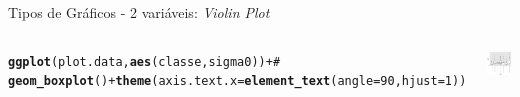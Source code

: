 \documentclass{beamer}\usepackage[]{graphicx}\usepackage[]{color}
\makeatletter
\newcommand{\hlnum}[1]{\textcolor[rgb]{0.686,0.059,0.569}{#1}}%
\newcommand{\hlcom}[1]{\textcolor[rgb]{0.678,0.584,0.686}{\textit{#1}}}%
\newcommand{\hlopt}[1]{\textcolor[rgb]{0,0,0}{#1}}%
\newcommand{\hlstd}[1]{\textcolor[rgb]{0.345,0.345,0.345}{#1}}%
\newcommand{\hlkwc}[1]{\textcolor[rgb]{0.333,0.667,0.333}{#1}}%
\newcommand{\hlkwd}[1]{\textcolor[rgb]{0.737,0.353,0.396}{\textbf{#1}}}%
\newenvironment{kframe}{%
 \def\at@end@of@kframe{}%
 \ifinner\ifhmode%
  \def\at@end@of@kframe{\end{minipage}}%
  \begin{minipage}{\columnwidth}%
 \fi\fi%
 \def\FrameCommand##1{\hskip\@totalleftmargin \hskip-\fboxsep
 \colorbox{shadecolor}{##1}\hskip-\fboxsep
     \hskip-\linewidth \hskip-\@totalleftmargin \hskip\columnwidth}%
 \MakeFramed {\advance\hsize-\width
   \@totalleftmargin\z@ \linewidth\hsize
   \@setminipage}}%
 {\par\unskip\endMakeFramed%
 \at@end@of@kframe}
\newenvironment{knitrout}{}{} %
\renewenvironment{knitrout}{\setlength{\topsep}{0mm}}{}
\makeatother
\begin{document}
\begin{frame}[fragile]{Tipos de Gráficos - 2 variáveis: \emph{Violin Plot}}

\begin{columns}[t]


\begin{knitrout}\tiny
{}\color{fgcolor}\begin{kframe}
\begin{alltt}
\hlkwd{ggplot}\hlstd{(plot.data,}\hlkwd{aes}\hlstd{(classe,sigma0))} \hlopt{+}\hlcom{#}
  \hlkwd{geom_boxplot}\hlstd{()} \hlopt{+} \hlkwd{theme}\hlstd{(}\hlkwc{axis.text.x} \hlstd{=} \hlkwd{element_text}\hlstd{(}\hlkwc{angle} \hlstd{=} \hlnum{90}\hlstd{,} \hlkwc{hjust} \hlstd{=} \hlnum{1}\hlstd{))}
\end{alltt}
\end{kframe}
\end{knitrout}


\begin{knitrout}
\color{fgcolor}
\includegraphics[width=1\linewidth]{figure/unnamed-chunk-75-1} 

\end{knitrout}

\end{columns}

\end{frame}
\end{document}
